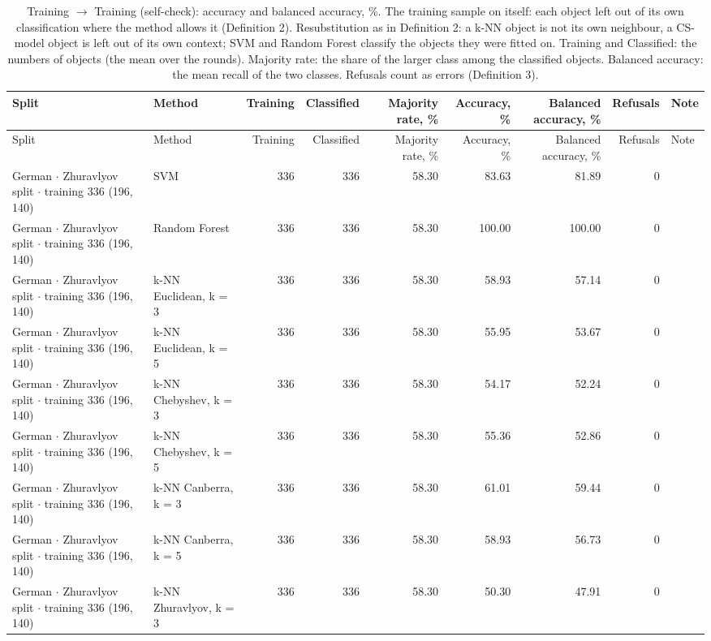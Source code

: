 \begin{longtable}{llrrrrrrl}
  \caption{Training $\to$ Training (self-check): accuracy and balanced accuracy, \%. The training sample on itself: each object left out of its own classification where the method allows it (Definition 2). Resubstitution as in Definition 2: a k-NN object is not its own neighbour, a CS-model object is left out of its own context; SVM and Random Forest classify the objects they were fitted on. Training and Classified: the numbers of objects (the mean over the rounds). Majority rate: the share of the larger class among the classified objects. Balanced accuracy: the mean recall of the two classes. Refusals count as errors (Definition 3).}\label{tab:training-self} \\
  \toprule
  Split & Method & Training & Classified & Majority rate, \% & Accuracy, \% & Balanced accuracy, \% & Refusals & Note \\
  \midrule
  \endfirsthead
  \toprule
  Split & Method & Training & Classified & Majority rate, \% & Accuracy, \% & Balanced accuracy, \% & Refusals & Note \\
  \midrule
  \endhead
  \bottomrule
  \endfoot
  German $\cdot$ Zhuravlyov split $\cdot$ training 336 (196, 140) & SVM & 336 & 336 & 58.30 & 83.63 & 81.89 & 0 &  \\
  German $\cdot$ Zhuravlyov split $\cdot$ training 336 (196, 140) & Random Forest & 336 & 336 & 58.30 & 100.00 & 100.00 & 0 &  \\
  German $\cdot$ Zhuravlyov split $\cdot$ training 336 (196, 140) & k-NN Euclidean, k = 3 & 336 & 336 & 58.30 & 58.93 & 57.14 & 0 &  \\
  German $\cdot$ Zhuravlyov split $\cdot$ training 336 (196, 140) & k-NN Euclidean, k = 5 & 336 & 336 & 58.30 & 55.95 & 53.67 & 0 &  \\
  German $\cdot$ Zhuravlyov split $\cdot$ training 336 (196, 140) & k-NN Chebyshev, k = 3 & 336 & 336 & 58.30 & 54.17 & 52.24 & 0 &  \\
  German $\cdot$ Zhuravlyov split $\cdot$ training 336 (196, 140) & k-NN Chebyshev, k = 5 & 336 & 336 & 58.30 & 55.36 & 52.86 & 0 &  \\
  German $\cdot$ Zhuravlyov split $\cdot$ training 336 (196, 140) & k-NN Canberra, k = 3 & 336 & 336 & 58.30 & 61.01 & 59.44 & 0 &  \\
  German $\cdot$ Zhuravlyov split $\cdot$ training 336 (196, 140) & k-NN Canberra, k = 5 & 336 & 336 & 58.30 & 58.93 & 56.73 & 0 &  \\
  German $\cdot$ Zhuravlyov split $\cdot$ training 336 (196, 140) & k-NN Zhuravlyov, k = 3 & 336 & 336 & 58.30 & 50.30 & 47.91 & 0 &  \\

\end{longtable}
